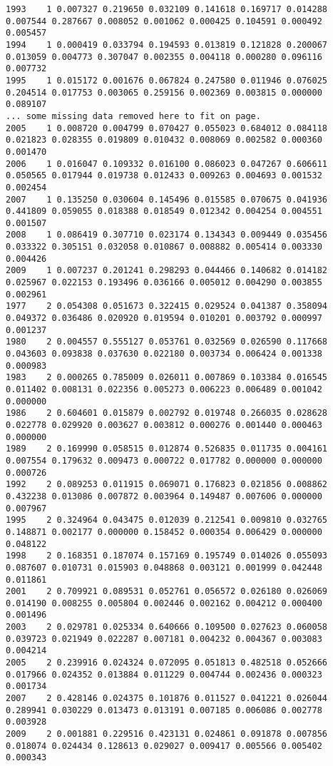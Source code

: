 \begin{landscape}
\begin{table}
\begin{scriptsize}
\begin{verbatim}
1993    1 0.007327 0.219650 0.032109 0.141618 0.169717 0.014288 0.007544 0.287667 0.008052 0.001062 0.000425 0.104591 0.000492 0.005457
1994    1 0.000419 0.033794 0.194593 0.013819 0.121828 0.200067 0.013059 0.004773 0.307047 0.002355 0.004118 0.000280 0.096116 0.007732
1995    1 0.015172 0.001676 0.067824 0.247580 0.011946 0.076025 0.204514 0.017753 0.003065 0.259156 0.002369 0.003815 0.000000 0.089107
...	some missing data removed here to fit on page.
2005    1 0.008720 0.004799 0.070427 0.055023 0.684012 0.084118 0.021823 0.028355 0.019809 0.010432 0.008069 0.002582 0.000360 0.001470
2006    1 0.016047 0.109332 0.016100 0.086023 0.047267 0.606611 0.050565 0.017944 0.019738 0.012433 0.009263 0.004693 0.001532 0.002454
2007    1 0.135250 0.030604 0.145496 0.015585 0.070675 0.041936 0.441809 0.059055 0.018388 0.018549 0.012342 0.004254 0.004551 0.001507
2008    1 0.086419 0.307710 0.023174 0.134343 0.009449 0.035456 0.033322 0.305151 0.032058 0.010867 0.008882 0.005414 0.003330 0.004426
2009    1 0.007237 0.201241 0.298293 0.044466 0.140682 0.014182 0.025967 0.022153 0.193496 0.036166 0.005012 0.004290 0.003855 0.002961
1977    2 0.054308 0.051673 0.322415 0.029524 0.041387 0.358094 0.049372 0.036486 0.020920 0.019594 0.010201 0.003792 0.000997 0.001237
1980    2 0.004557 0.555127 0.053761 0.032569 0.026590 0.117668 0.043603 0.093838 0.037630 0.022180 0.003734 0.006424 0.001338 0.000983
1983    2 0.000265 0.785009 0.026011 0.007869 0.103384 0.016545 0.011402 0.008131 0.022356 0.005273 0.006223 0.006489 0.001042 0.000000
1986    2 0.604601 0.015879 0.002792 0.019748 0.266035 0.028628 0.022778 0.029920 0.003627 0.003812 0.000276 0.001440 0.000463 0.000000
1989    2 0.169990 0.058515 0.012874 0.526835 0.011735 0.004161 0.007554 0.179632 0.009473 0.000722 0.017782 0.000000 0.000000 0.000726
1992    2 0.089253 0.011915 0.069071 0.176823 0.021856 0.008862 0.432238 0.013086 0.007872 0.003964 0.149487 0.007606 0.000000 0.007967
1995    2 0.324964 0.043475 0.012039 0.212541 0.009810 0.032765 0.148871 0.002177 0.000000 0.158452 0.000354 0.006429 0.000000 0.048122
1998    2 0.168351 0.187074 0.157169 0.195749 0.014026 0.055093 0.087607 0.010731 0.015903 0.048868 0.003121 0.001999 0.042448 0.011861
2001    2 0.709921 0.089531 0.052761 0.056572 0.026180 0.026069 0.014190 0.008255 0.005804 0.002446 0.002162 0.004212 0.000400 0.001496
2003    2 0.029781 0.025334 0.640666 0.109500 0.027623 0.060058 0.039723 0.021949 0.022287 0.007181 0.004232 0.004367 0.003083 0.004214
2005    2 0.239916 0.024324 0.072095 0.051813 0.482518 0.052666 0.017966 0.024352 0.013884 0.011229 0.004744 0.002436 0.000323 0.001734
2007    2 0.428146 0.024375 0.101876 0.011527 0.041221 0.026044 0.289941 0.030229 0.013473 0.013191 0.007185 0.006086 0.002778 0.003928
2009    2 0.001881 0.229516 0.423131 0.024861 0.091878 0.007856 0.018074 0.024434 0.128613 0.029027 0.009417 0.005566 0.005402 0.000343
\end{verbatim}
\end{scriptsize}
\end{table}
\end{landscape}



